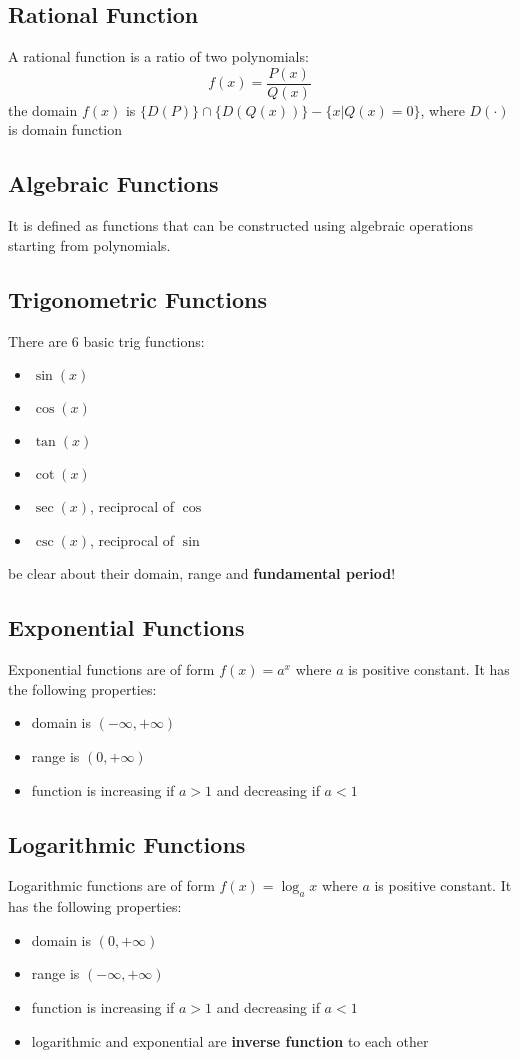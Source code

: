 \documentclass[10pt,a4paper,oneside]{article}
\begin{document}
\subsection{Rational Function}
A rational function is a ratio of two polynomials:
\[
f(x) = \frac{P(x)}{Q(x)}
\]
the domain $f(x)$ is $\{D(P)\} \cap \{D(Q(x))\} - \{x|Q(x) = 0\}$, where $D(\cdot)$ is domain function

\subsection{Algebraic Functions}
It is defined as functions that can be constructed using algebraic operations starting from polynomials.

\subsection{Trigonometric Functions}
There are $6$ basic trig functions:
\begin{itemize}
	\item $\sin(x)$
	\item $\cos(x)$
	\item $\tan(x)$
	\item $\cot(x)$
	\item $\sec(x)$, reciprocal of $\cos$
	\item $\csc(x)$, reciprocal of $\sin$
\end{itemize}
be clear about their domain, range and \textbf{fundamental period}!

\subsection{Exponential Functions}
Exponential functions are of form $f(x) = a^x$ where $a$ is positive constant. It has the following properties:
\begin{itemize}
	\item domain is $(-\infty, +\infty)$
	\item range is $(0, +\infty)$
	\item function is increasing if $a > 1$ and decreasing if $a < 1$
\end{itemize}

\subsection{Logarithmic Functions}
Logarithmic functions are of form $f(x) = \log _a x$ where $a$ is positive constant.  It has the following properties:
\begin{itemize}
	\item domain is $(0, +\infty)$
	\item range is $(-\infty, +\infty)$
	\item function is increasing if $a > 1$ and decreasing if $a < 1$
	\item logarithmic and exponential are \textbf{inverse function} to each other
\end{itemize}
\end{document}
